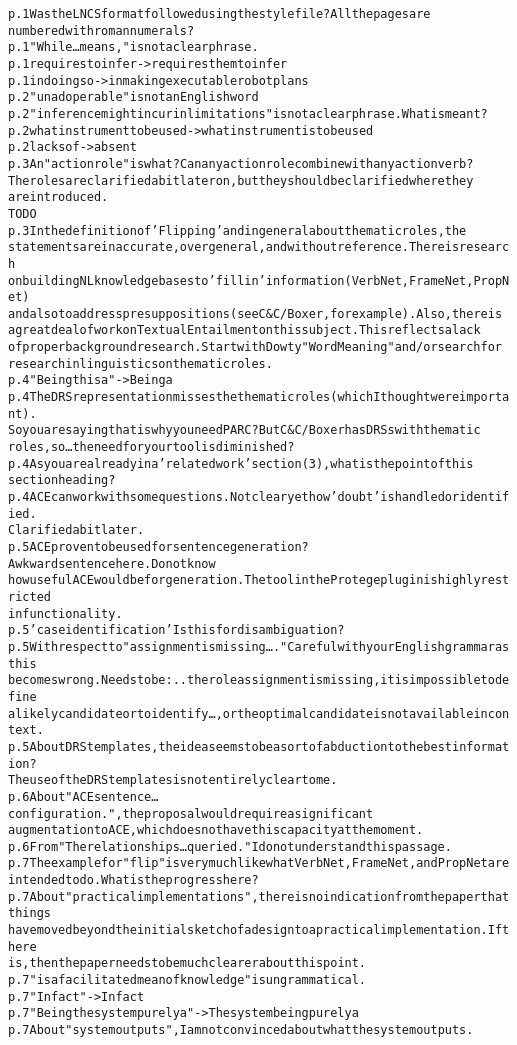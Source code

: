 \documentclass[oribibl]{llncs}
\newcommand{\comment}[1]{{\color{red} #1}}
\newcommand{\tick}{{\color{red}\ding{52}}}
\begin{document}
\begin{alltt}
p. 1 Was the LNCS format followed using the style file?  All the pages are 
numbered with roman numerals?
p. 1 "While…means," is not a clear phrase.
p. 1 requires to infer -> requires them to infer \tick
p. 1 in doing so -> in making executable robot plans
p. 2 "unadoperable" is not an English word \tick
p. 2  "inference might incur in limitations" is not a clear phrase.  What is meant?
p. 2  what instrument to be used -> what instrument is to be used \tick
p. 2 lacks of -> absent \tick
p. 3 An "action role" is what?  Can any action role combine with any action verb?  
The roles are clarified a bit later on, but they should be clarified where they 
are introduced.
\comment{TODO}
p. 3 In the definition of 'Flipping' and in general about thematic roles, the 
statements are inaccurate, overgeneral, and without reference.  There is research 
on building NL knowledge bases to 'fill in' information (VerbNet, FrameNet, PropNet)
 and also to address presuppositions (see C&C/Boxer, for example).  Also, there is 
 a great deal of work on Textual Entailment on this subject.  This reflects a lack 
 of proper background research.  Start with Dowty "Word Meaning" and/or search for 
 research in linguistics on thematic roles.
p. 4 "Being this a" -> Being a
p. 4 The DRS representation misses the thematic roles (which I thought were important).
  So you are saying that is why you need PARC?  But C&C/Boxer has DRSs with thematic 
  roles, so…the need for your tool is diminished?
p. 4 As you are already in a 'related work' section (3), what is the point of this 
section heading?
p. 4 ACE can work with some questions.  Not clear yet how 'doubt' is handled or identified.
  Clarified a bit later.
p. 5 ACE proven to be used for sentence generation?  Awkward sentence here.  Do not know 
how useful ACE would be for generation.  The tool in the Protege plug in is highly restricted
 in functionality.
p. 5 'case identification' Is this for disambiguation?
p. 5 With respect to "assignment is missing…."  Careful with your English grammar as this 
becomes wrong.  Needs to be: ..the role assignment is missing, it is impossible to define 
a likely candidate or to identify…, or the optimal candidate is not available in context.
p. 5 About DRS templates, the idea seems to be a sort of abduction to the best information?
  The use of the DRS templates is not entirely clear to me.
p. 6 About "ACE sentence…configuration.", the proposal would require a significant 
augmentation to ACE, which does not have this capacity at the moment.
p. 6 From "The relationships…queried."  I do not understand this passage.
p. 7 The example for "flip" is very much like what VerbNet, FrameNet, and PropNet are 
intended to do.  What is the progress here?
p. 7 About "practical implementations", there is no indication from the paper that things 
have moved beyond the initial sketch of a design to a practical implementation.  If there 
is, then the paper needs to be much clearer about this point.
p. 7 "is a facilitated mean of knowledge" is ungrammatical.
p. 7 "Infact" -> In fact
p. 7 "Being the system purely a" -> The system being purely a
p. 7 About "system outputs", I am not convinced about what the system outputs.



\end{alltt}
\end{document}
